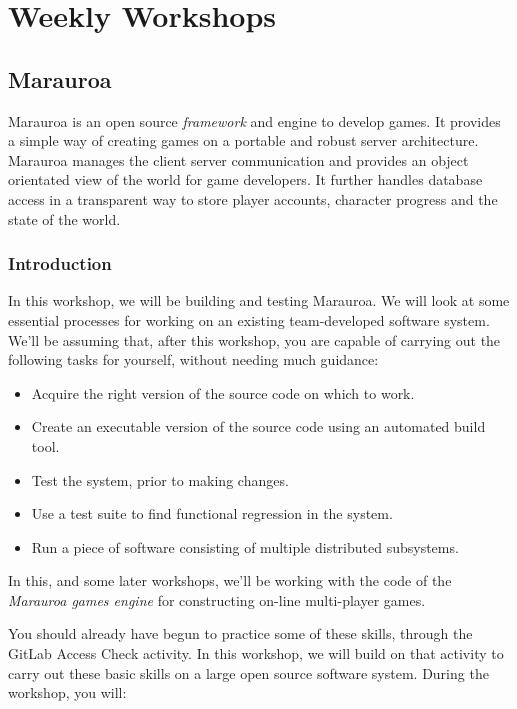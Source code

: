 \documentclass[
]{book}
\providecommand{\tightlist}{%
  \setlength{\itemsep}{0pt}\setlength{\parskip}{0pt}}
\begin{document}
\hypertarget{part-weekly-workshops}{%
\part{Weekly Workshops}\label{part-weekly-workshops}}

\hypertarget{building}{%
\chapter{Marauroa}\label{building}}

Marauroa is an open source \emph{framework} and engine to develop games. It provides a simple way of creating games on a portable and robust server architecture. Marauroa manages the client server communication and provides an object orientated view of the world for game developers. It further handles database access in a transparent way to store player accounts, character progress and the state of the world.

\hypertarget{Introduction}{%
\section{Introduction}\label{Introduction}}

In this workshop, we will be building and testing Marauroa. We will look at some essential processes for working on an existing team-developed software system. We'll be assuming that, after this workshop, you are capable of carrying out the following tasks for yourself, without needing much guidance:

\begin{itemize}
\tightlist
\item
  Acquire the right version of the source code on which to work.
\item
  Create an executable version of the source code using an automated build tool.
\item
  Test the system, prior to making changes.
\item
  Use a test suite to find functional regression in the system.\\
\item
  Run a piece of software consisting of multiple distributed subsystems.
\end{itemize}

In this, and some later workshops, we'll be working with the code of the \emph{Marauroa games engine} for constructing on-line multi-player games.

You should already have begun to practice some of these skills, through the GitLab Access Check activity.
In this workshop, we will build on that activity to carry out these basic skills on a large open source software system. During the workshop, you will:
\end{document}

